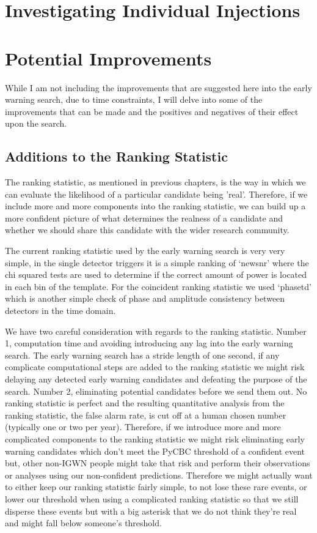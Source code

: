 \section{\label{6:sec:stories}Investigating Individual Injections}

\section{\label{6:sec:potential-improvements}Potential Improvements}

While I am not including the improvements that are suggested here into the early warning search, due to time constraints, I will delve into some of the improvements that can be made and the positives and negatives of their effect upon the search.

\subsection{\label{6:subsec:ranking-statistic}Additions to the Ranking Statistic}

The ranking statistic, as mentioned in previous chapters, is the way in which we can evaluate the likelihood of a particular candidate being 'real'. Therefore, if we include more and more components into the ranking statistic, we can build up a more confident picture of what determines the realness of a candidate and whether we should share this candidate with the wider research community.

The current ranking statistic used by the early warning search is very very simple, in the single detector triggers it is a simple ranking of `newsnr' where the chi squared tests are used to determine if the correct amount of power is located in each bin of the template. For the coincident ranking statistic we used `phasetd' which is another simple check of phase and amplitude consistency between detectors in the time domain.

We have two careful consideration with regards to the ranking statistic. Number 1, computation time and avoiding introducing any lag into the early warning search. The early warning search has a stride length of one second, if any complicate computational steps are added to the ranking statistic we might risk delaying any detected early warning candidates and defeating the purpose of the search. Number 2, eliminating potential candidates before we send them out. No ranking statistic is perfect and the resulting quantitative analysis from the ranking statistic, the false alarm rate, is cut off at a human chosen number (typically one or two per year). Therefore, if we introduce more and more complicated components to the ranking statistic we might risk eliminating early warning candidates which don't meet the PyCBC threshold of a confident event but, other non-IGWN people might take that risk and perform their observations or analyses using our non-confident predictions. Therefore we might actually want to either keep our ranking statistic fairly simple, to not lose these rare events, or lower our threshold when using a complicated ranking statistic so that we still disperse these events but with a big asterisk that we do not think they're real and might fall below someone's threshold.

